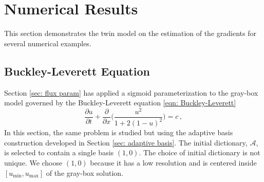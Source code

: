 %

\newpage
\section{Numerical Results}
\label{sec: twin numerical results}
This section demonstrates the twin model on the estimation of the gradients for
several numerical examples.


\subsection{Buckley-Leverett Equation}
\label{sec: chap 2 BL}
Section \ref{sec: flux param} has applied a sigmoid parameterization to the gray-box model
governed by the Buckley-Leverett equation \eqref{eqn: Buckley-Leverett}
\begin{equation*}
    \frac{\partial u}{\partial t} + \frac{\partial}{\partial x}\Big({
    \frac{u^2}{1+ 2(1-u)^2}} \Big) = c\,,
\end{equation*}
In this section, the same problem 
is studied but using the adaptive basis construction developed 
in Section \ref{sec: adaptive basis}. 
The initial dictionary, $\mathcal{A}$, is selected to contain a single basis
$\left(1, 0\right)$. The choice of initial dictionary is not unique.
We choose $\left(1, 0\right)$ because it has a low resolution 
and is centered inside $\left[u_{\min}, u_{\max}\right]$ of the gray-box solution.\\

